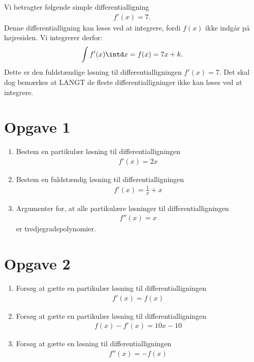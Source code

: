 \begin{exa}
Vi betragter følgende simple differentialligning
\begin{align*}
f'(x) = 7.
\end{align*}
Denne differentialligning kan løses ved at integrere, fordi $f(x)$ ikke indgår på højresiden. Vi integrerer derfor:
\begin{align*}
	\int f'(x)\intd x = f(x) = 7x + k.
\end{align*}
Dette er den fuldstændige løsning til differentialligningen $f'(x) = 7.$ Det skal dog bemærkes at LANGT de fleste differentialligninger ikke kan løses ved at integrere. 
\end{exa}

\section*{Opgave 1}
\begin{enumerate}[label=\roman*)]
	\item Bestem en partikulær løsning til differentialligningen 
	\begin{align*}
		f'(x) = 2x
	\end{align*}
	\item Bestem en fuldstændig løsning til differentialligningen
	\begin{align*}
		f'(x) = \frac{1}{x} + x
	\end{align*}
	\item Argumenter for, at alle partikulære løsninger til differentialligningen
	\begin{align*}
		f''(x) = x
	\end{align*}
	er tredjegradspolynomier. 
\end{enumerate}

\section*{Opgave 2}
\begin{enumerate}[label=\roman*)]
	\item Forsøg at gætte en partikulær løsning til differentialligningen 
	\begin{align*}
		f'(x) = f(x)
	\end{align*}
	\item Forsøg at gætte en partikulær løsning til differentialligningen
	\begin{align*}
		f(x) - f'(x) = 10x-10
	\end{align*}
	\item Forsøg at gætte en løsning til differentialligningen 
	\begin{align*}
		f''(x) = -f(x)
	\end{align*}
\end{enumerate}
